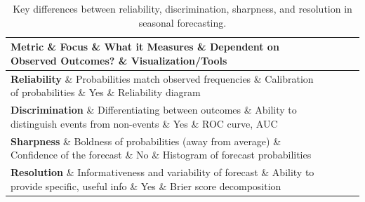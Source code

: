 \begin{table}[h!]
\centering
\begin{tabularx}{\textwidth}{@{}p{2.5cm}X X p{2.5cm}X@{}}
\toprule
\textbf{Metric}        \& \textbf{Focus}                                    \& \textbf{What it Measures}                         \& \textbf{Dependent on Observed Outcomes?} \& \textbf{Visualization/Tools}             \\ \midrule
\textbf{Reliability}   \& Probabilities match observed frequencies          \& Calibration of probabilities                      \& Yes                                      \& Reliability diagram                      \\
\textbf{Discrimination} \& Differentiating between outcomes                 \& Ability to distinguish events from non-events    \& Yes                                      \& ROC curve, AUC                           \\
\textbf{Sharpness}     \& Boldness of probabilities (away from average)     \& Confidence of the forecast                        \& No                                       \& Histogram of forecast probabilities      \\
\textbf{Resolution}    \& Informativeness and variability of forecast       \& Ability to provide specific, useful info         \& Yes                                      \& Brier score decomposition                \\ \bottomrule
\end{tabularx}
\caption{Key differences between reliability, discrimination, sharpness, and resolution in seasonal forecasting.}
\end{table}


%
%


